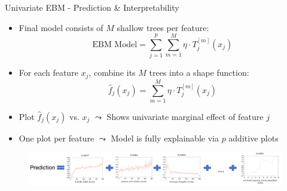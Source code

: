 \documentclass[10pt,compress,t,notes=noshow, xcolor=table]{beamer}
\begin{document}




\begin{frame}{Univariate EBM - Prediction \& Interpretability}
\begin{itemize}
    \item Final model consists of $M$ shallow trees per feature:
    $$
    \text{EBM Model} = \sum_{j=1}^p \sum_{m=1}^M \eta \cdot T_j^{[m]}(x_j)
    $$
    \item For each feature $x_j$, combine its $M$ trees into a shape function:
    $$
    \hat{f}_j(x_j) = \sum_{m=1}^M \eta \cdot T_j^{[m]}(x_j)
    $$
    \item Plot $\hat{f}_j(x_j)$ vs. $x_j$ $\leadsto$ Shows univariate marginal effect of feature $j$
    \item One plot per feature $\leadsto$ Model is fully explainable via $p$ additive plots
\end{itemize}

\medskip

\begin{figure}
    \centering
    \includegraphics[width=\textwidth]{figure/ebm_prediction.png}
\end{figure}
\end{frame}
\end{document}
